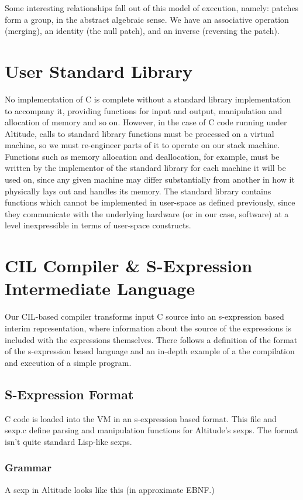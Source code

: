 \documentclass[10pt,a4paper]{report}
\begin{document}
Some interesting relationships fall out of this model of execution, namely: patches form a group, in the abstract algebraic sense. We have an associative operation (merging), an identity (the null patch), and an inverse (reversing the patch).

\section{User Standard Library}
No implementation of C is complete without a standard library implementation to accompany it, providing functions for input and output, manipulation and allocation of memory and so on. However, in the case of C code running under Altitude, calls to standard library functions must be processed on a virtual machine, so we must re-engineer parts of it to operate on our stack machine. Functions such as memory allocation and deallocation, for example, must be written by the implementor of the standard library for each machine it will be used on, since any given machine may differ substantially from another in how it physically lays out and handles its memory. The standard library contains functions which cannot be implemented in user-space as defined previously, since they communicate with the underlying hardware (or in our case, software) at a level inexpressible in terms of user-space constructs.

\section{CIL Compiler \& S-Expression Intermediate Language}
Our CIL-based compiler transforms input C source into an s-expression based interim representation, where information about the source of the expressions is included with the expressions themselves. There follows a definition of the format of the s-expression based language and an in-depth example of a the compilation and execution of a simple program.

\subsection{S-Expression Format}
C code is loaded into the VM in an s-expression based format. This file and sexp.c define parsing and manipulation functions for Altitude's sexps. The format isn't quite standard Lisp-like sexps.

\subsubsection{Grammar}
A sexp in Altitude looks like this (in approximate EBNF.)
 
\end{document}
